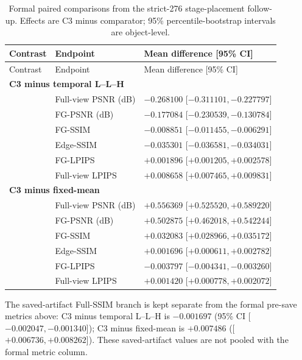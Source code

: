 \documentclass[11pt]{article}
\begin{document}
\begin{longtable}{p{3.0cm}p{2.6cm}p{5.8cm}}
\caption{Formal paired comparisons from the strict-276 stage-placement follow-up. Effects are C3 minus comparator; 95\% percentile-bootstrap intervals are object-level.}\label{tab:supp-stage-placement}\\
\toprule Contrast & Endpoint & Mean difference [95\% CI] \\
\midrule\endfirsthead
\toprule Contrast & Endpoint & Mean difference [95\% CI] \\
\midrule\endhead
\multicolumn{3}{l}{\textbf{C3 minus temporal L--L--H}}\\
 & Full-view PSNR (dB) & $-0.268100$ [$-0.311101,-0.227797$] \\
 & FG-PSNR (dB) & $-0.177084$ [$-0.230539,-0.130784$] \\
 & FG-SSIM & $-0.008851$ [$-0.011455,-0.006291$] \\
 & Edge-SSIM & $-0.035301$ [$-0.036581,-0.034031$] \\
 & FG-LPIPS & $+0.001896$ [$+0.001205,+0.002578$] \\
 & Full-view LPIPS & $+0.008658$ [$+0.007465,+0.009831$] \\
\multicolumn{3}{l}{\textbf{C3 minus fixed-mean}}\\
 & Full-view PSNR (dB) & $+0.556369$ [$+0.525520,+0.589220$] \\
 & FG-PSNR (dB) & $+0.502875$ [$+0.462018,+0.542244$] \\
 & FG-SSIM & $+0.032083$ [$+0.028966,+0.035172$] \\
 & Edge-SSIM & $+0.001696$ [$+0.000611,+0.002782$] \\
 & FG-LPIPS & $-0.003797$ [$-0.004341,-0.003260$] \\
 & Full-view LPIPS & $+0.001420$ [$+0.000778,+0.002072$] \\
\bottomrule
\end{longtable}

The saved-artifact Full-SSIM branch is kept separate from the formal pre-save metrics above: C3 minus temporal L--L--H is $-0.001697$ (95\% CI [$-0.002047,-0.001340$]); C3 minus fixed-mean is $+0.007486$ ([$+0.006736,+0.008262$]). These saved-artifact values are not pooled with the formal metric column.
\end{document}
